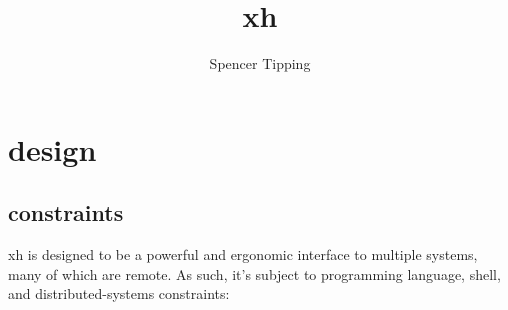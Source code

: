 \documentclass{report}
\title{xh}
\author{Spencer Tipping}
\begin{document}
\maketitle{}
\tableofcontents{}


\part{design}\label{part:design}
\chapter{constraints}\label{chp:design-constraints}
  xh is designed to be a powerful and ergonomic interface to multiple systems,
  many of which are remote. As such, it's subject to programming language,
  shell, and distributed-systems constraints:
\end{document}
